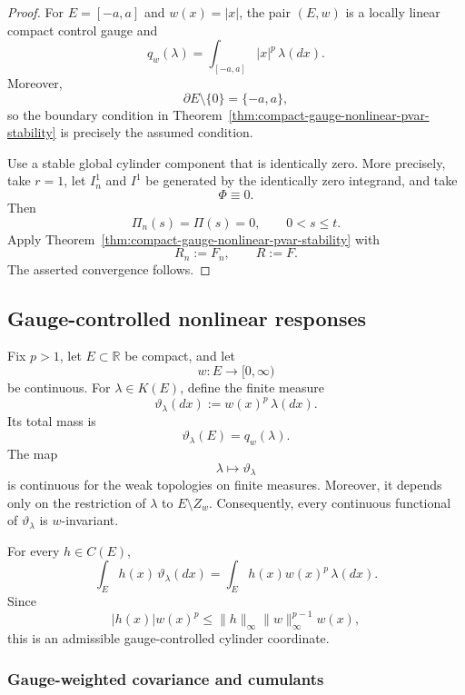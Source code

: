 \documentclass[a4paper,10pt]{article}
\begin{document}
\begin{proof}
For \(E=[-a,a]\) and \(w(x)=|x|\), the pair \((E,w)\) is a locally
linear compact control gauge and
\[
        q_w(\lambda)
        =
        \int_{[-a,a]}|x|^p\,\lambda(dx).
\]
Moreover,
\[
        \partial E\setminus\{0\}
        =
        \{-a,a\},
\]
so the boundary condition in
Theorem~\ref{thm:compact-gauge-nonlinear-pvar-stability} is precisely
the assumed condition.

Use a stable global cylinder component that is identically zero.
More precisely, take
\(r=1\), let \(I_n^1\) and \(I^1\) be generated by the identically
zero integrand, and take
\[
        \Phi\equiv0.
\]
Then
\[
        \Pi_n(s)=\Pi(s)=0,
        \qquad 0<s\le t.
\]
Apply Theorem~\ref{thm:compact-gauge-nonlinear-pvar-stability} with
\[
        R_n:=F_n,
        \qquad
        R:=F.
\]
The asserted convergence follows.
\end{proof}






\subsection{Gauge-controlled nonlinear responses}
\label{subsec:nonlinear-compensator-examples}

Fix \(p>1\), let \(E\subset\mathbb R\) be compact, and let
\[
        w:E\longrightarrow[0,\infty)
\]
be continuous. For \(\lambda\in K(E)\), define the finite measure
\[
        \vartheta_\lambda(dx)
        :=
        w(x)^p\,\lambda(dx).
\]
Its total mass is
\[
        \vartheta_\lambda(E)
        =
        q_w(\lambda).
\]
The map
\[
        \lambda\longmapsto\vartheta_\lambda
\]
is continuous for the weak topologies on finite measures. Moreover, it
depends only on the restriction of \(\lambda\) to \(E\setminus Z_w\).
Consequently, every continuous functional of \(\vartheta_\lambda\) is
\(w\)-invariant.

For every \(h\in C(E)\),
\[
\int_Eh(x)\,\vartheta_\lambda(dx)
=
\int_Eh(x)w(x)^p\,\lambda(dx).
\]
Since
\[
        |h(x)|w(x)^p
        \le
        \lVert h\rVert_\infty
        \lVert w\rVert_\infty^{p-1}w(x),
\]
this is an admissible gauge-controlled cylinder coordinate.

\subsubsection{Gauge-weighted covariance and cumulants}
\end{document}

